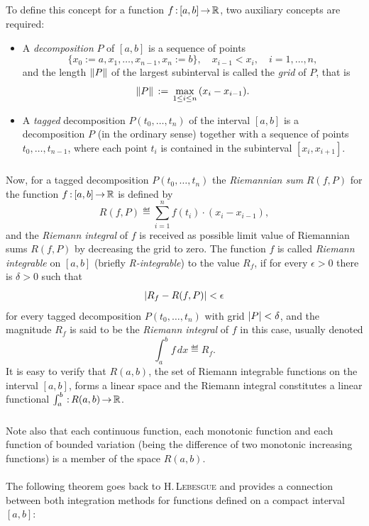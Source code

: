 \documentclass[11pt,twoside]{article}
\begin{document}
\subparagraph{}
To define this concept for a function $f {\,:\,} [a,b] {\,\to\,} {\mathbb{R}}$,
two auxiliary concepts are required:

\begin{itemize}[leftmargin=22pt]
\item[1.]
A \textit{decomposition} $P$ of $[a,b]$ is a sequence of points
\[
\{x_0 := a,x_1,\ldots,x_{n-1},x_n := b \},
\quad x_{i-1} < x_i, \quad i=1,\ldots,n,
\]
and the length $\lVert P \rVert $ of the largest subinterval
is called the \textit{grid} of $P$,
that is
\[
\lVert P \rVert \,:=\, \max_{1 \leq i \leq n} \, (x_i-x_{i-1}).
\]

\item[2.]
A \textit{tagged} decomposition $P(t_0,\ldots,t_n)$
of the interval $[a,b]$
is a decomposition $P$ (in the ordinary sense) together with a 
sequence of points $t_0,\ldots,t_{n-1}$,
where each point $t_i$ is contained in the subinterval $[x_i,x_{i+1}]$.
\end{itemize}

\subparagraph{}
Now, 
for a tagged decomposition $P(t_0,\ldots,t_n)$ 
the \textit{Riemannian sum} $R(f,P)$
for the function $f{\,:\,}[a,b] {\,\to\,} {\mathbb{R}}$ is defined by
\[
R(f,P) \eqdef \sum_{i=1}^n f(t_i) \cdot (x_i - x_{i-1}),
\]
and the \textit{Riemann integral} of $f$ is received as
possible limit value of Riemannian sums $R(f,P)$ by decreasing the
grid to zero.
The function $f$ is called \textit{Riemann integrable} on $[a,b]$
(briefly \textit{R-integrable}) to the value $R_f$,
if for every $\epsilon > 0$ there is $\delta > 0$
such that
\[
\abs{ R_f - R(f,P)} < \epsilon
\]
for every tagged decomposition $P(t_0,\ldots,t_n)$
with grid $\abs{P} < \delta$,
and the magnitude $R_f$ is said to be the \textit{Riemann integral} of $f$
in this case,
usually denoted
\[
\int_a^b f \, dx \eqdef R_f.
\]
It is easy to verify
that $R(a,b)$,
the set of Riemann integrable functions on the interval $[a,b]$,
forms a linear space and the Riemann integral constitutes
a linear functional $\int_a^b {\,:\,} R(a,b) {\,\to\,} {\mathbb{R}}$.

\subparagraph{}
Note also that
each continuous function,
each monotonic function and
each function of bounded variation 
(being the difference of two monotonic increasing functions)
is a member of the space $R(a,b)$.

\paragraph{}
The following theorem goes back to \textsc{H.\,Lebesgue}
and provides a connection between both integration methods
for functions defined on a compact interval $[a,b]$:
\end{document}
